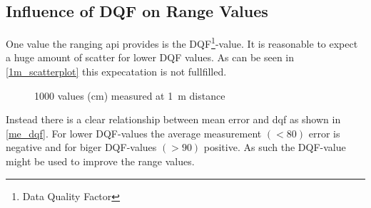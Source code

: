 %		
%
%		
%
%		


\subsection{Influence of DQF on Range Values}
One value the ranging api provides is the DQF\footnote{Data Quality Factor}-value.
It is reasonable to expect a huge amount of scatter for lower DQF values.
As can be seen in \autoref{1m_scatterplot} this expecatation is not fullfilled.

\begin{figure}[h]
	\centering
	
	\caption{1000 values (cm) measured at \SI{1}{\metre} distance}
	\label{1m_scatterplot}
\end{figure}

Instead there is a clear relationship between mean error and dqf as shown in \autoref{me_dqf}.
For lower DQF-values the average measurement $(< 80)$ error is negative and for biger DQF-values $(> 90)$ positive.
As such the DQF-value might be used to improve the range values. 

